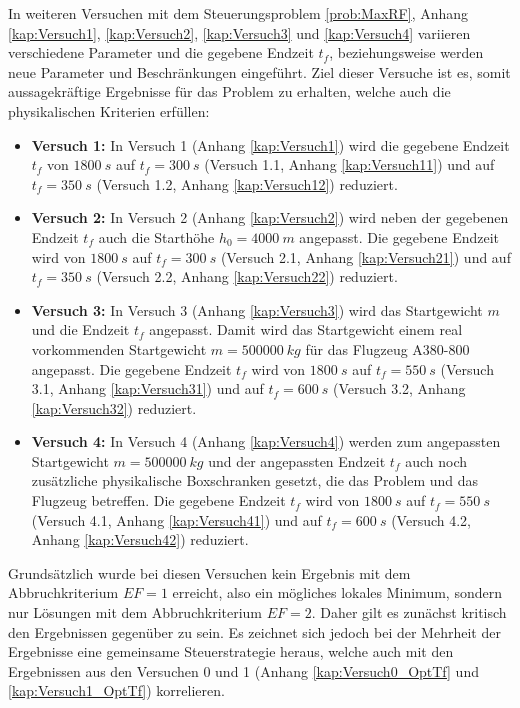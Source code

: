 In weiteren Versuchen mit dem Steuerungsproblem \ref{prob:MaxRF}, Anhang \ref{kap:Versuch1}, \ref{kap:Versuch2}, \ref{kap:Versuch3} und \ref{kap:Versuch4} variieren verschiedene Parameter und die gegebene Endzeit $t_f$, beziehungsweise werden neue Parameter und Beschränkungen eingeführt. Ziel dieser Versuche ist es, somit aussagekräftige Ergebnisse für das Problem zu erhalten, welche auch die physikalischen Kriterien erfüllen:
\begin{itemize}
\item \textbf{Versuch 1:} In Versuch 1 (Anhang \ref{kap:Versuch1}) wird die gegebene Endzeit $t_f$ von $1800 \ s$  auf $t_f = 300 \ s$ (Versuch 1.1, Anhang \ref{kap:Versuch11}) und  auf $t_f = 350 \ s$ (Versuch 1.2, Anhang \ref{kap:Versuch12}) reduziert. 
%
\item \textbf{Versuch 2:} In Versuch 2 (Anhang \ref{kap:Versuch2}) wird neben der gegebenen Endzeit $t_f$ auch die Starthöhe $h_0 = 4000 \ m$ angepasst. Die gegebene Endzeit wird von $1800 \ s$  auf $t_f = 300 \ s$ (Versuch 2.1, Anhang \ref{kap:Versuch21}) und  auf $t_f = 350 \ s$ (Versuch 2.2, Anhang \ref{kap:Versuch22}) reduziert.
%
\item \textbf{Versuch 3:} In Versuch 3 (Anhang \ref{kap:Versuch3}) wird das Startgewicht $m$ und die Endzeit $t_f$ angepasst. Damit wird das Startgewicht einem real vorkommenden Startgewicht $m = 500000 \ kg$ für das Flugzeug A380-800 angepasst. Die gegebene Endzeit $t_f$ wird von $1800 \ s$  auf $t_f = 550 \ s$ (Versuch 3.1, Anhang \ref{kap:Versuch31}) und  auf $t_f = 600 \ s$ (Versuch 3.2, Anhang \ref{kap:Versuch32}) reduziert.
%
\item \textbf{Versuch 4:} In Versuch 4 (Anhang \ref{kap:Versuch4}) werden zum angepassten Startgewicht $m = 500000 \ kg$ und der angepassten Endzeit $t_f$ auch noch zusätzliche physikalische Boxschranken gesetzt, die das Problem und das Flugzeug betreffen. Die gegebene Endzeit $t_f$ wird von $1800 \ s$  auf $t_f = 550 \ s$ (Versuch 4.1, Anhang \ref{kap:Versuch41}) und  auf $t_f = 600 \ s$ (Versuch 4.2, Anhang \ref{kap:Versuch42}) reduziert.
\end{itemize}
Grundsätzlich wurde bei diesen Versuchen kein Ergebnis mit dem Abbruchkriterium $EF = 1$ erreicht, also ein mögliches lokales Minimum, sondern nur Lösungen mit dem Abbruchkriterium $EF = 2$. Daher gilt es zunächst kritisch den Ergebnissen gegenüber zu sein. Es zeichnet sich jedoch bei der Mehrheit der Ergebnisse eine gemeinsame Steuerstrategie heraus, welche auch mit den Ergebnissen aus den Versuchen 0 und 1 (Anhang \ref{kap:Versuch0_OptTf} und \ref{kap:Versuch1_OptTf}) korrelieren.

